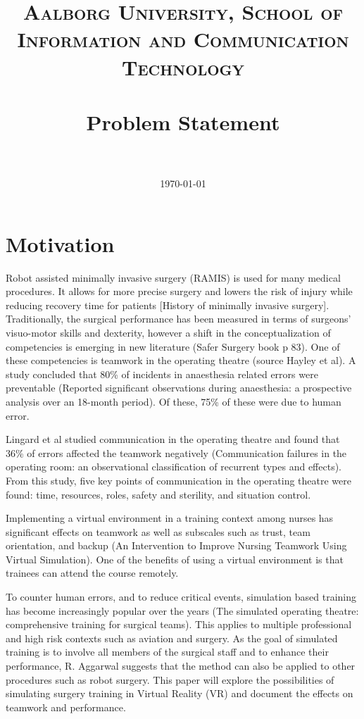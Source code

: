 \documentclass[paper=a4, fontsize=11pt]{scrartcl} %
\title{	
\normalfont \normalsize 
\textsc{Aalborg University, School of Information and Communication Technology} \\ [25pt] %
\horrule{0.5pt} \\[0.4cm] %
\huge Problem Statement \\ %
\horrule{2pt} \\[0.5cm] %
}
\date{\normalsize\today} %
\numberwithin{equation}{section} %
\numberwithin{figure}{section} %
\numberwithin{table}{section} %
\begin{document}
\maketitle %


\section{Motivation}

Robot assisted minimally invasive surgery (RAMIS) is used for many medical procedures. It allows for more precise surgery and lowers the risk of injury while reducing recovery time for patients [History of minimally invasive surgery]. Traditionally, the surgical performance has been measured in terms of surgeons' visuo-motor skills and dexterity, however a shift in the conceptualization of competencies is emerging in new literature (Safer Surgery book p 83). One of these competencies is teamwork in the operating theatre (source Hayley et al). A study concluded that 80\% of incidents in anaesthesia related errors were preventable (Reported significant observations during anaesthesia: a prospective analysis over an 18-month period). Of these, 75\% of these were due to human error. 

Lingard et al studied communication in the operating theatre and found that 36\% of errors affected the teamwork negatively (Communication failures in the operating room: an observational classification of recurrent types and effects). From this study, five key points of communication in the operating theatre were found: time, resources, roles, safety and sterility, and situation control.

Implementing a virtual environment in a training context among nurses has significant effects on teamwork as well as subscales such as trust, team orientation, and backup (An Intervention to Improve Nursing Teamwork Using Virtual Simulation). One of the benefits of using a virtual environment is that trainees can attend the course remotely. 

To counter human errors, and to reduce critical events, simulation based training has become increasingly popular over the years (The simulated operating theatre: comprehensive training for surgical teams). This applies to multiple professional and high risk contexts such as aviation and surgery. As the goal of simulated training is to involve all members of the surgical staff and to enhance their performance, R. Aggarwal suggests that the method can also be applied to other procedures such as robot surgery. 
This paper will explore the possibilities of simulating surgery training in Virtual Reality (VR) and document the effects on teamwork and performance. 
\end{document}
